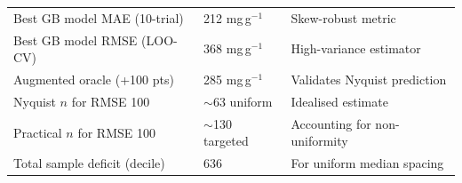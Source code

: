 \documentclass[12pt,a4paper]{article}
\begin{document}
\begin{table}[h]
\begin{tabular}{lll}
Best GB model MAE  (10-trial) & 212 mg\,g$^{-1}$ & Skew-robust metric \\
Best GB model RMSE (LOO-CV) & 368 mg\,g$^{-1}$ & High-variance estimator \\
Augmented oracle (+100 pts) & 285 mg\,g$^{-1}$ & Validates Nyquist prediction \\
\midrule
Nyquist $n$ for RMSE 100 & $\sim$63 uniform & Idealised estimate \\
Practical $n$ for RMSE 100 & $\sim$130 targeted & Accounting for non-uniformity \\
Total sample deficit (decile) & 636 & For uniform median spacing \\
\bottomrule
\end{tabular}
\end{table}


\end{document}
